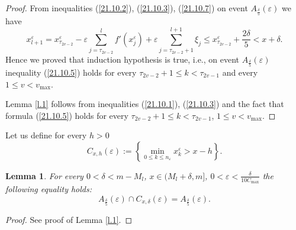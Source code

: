 \documentclass{article}
\theoremstyle{plain}
\newtheorem{lemma}[theorem]{Lemma}
\theoremstyle{definition}
\theoremstyle{remark}
\begin{document}
\begin{proof}
From inequalities (\ref{21.10.2}), (\ref{21.10.3}), (\ref{21.10.7}) on event $A_{\frac{\delta}{5}}\left(\varepsilon\right)$ we have
$$
x_{l+1}^{\varepsilon}=x_{\tau_{2v-2}}^{\varepsilon}-\varepsilon \sum\limits_{j=\tau_{2v-2}}^{l}f'(x_j^{\varepsilon})
+\varepsilon\sum\limits_{j=\tau_{2v-2}+1}^{l+1}\xi_j
\leqslant x_{\tau_{2v-2}}^{\varepsilon}+\frac{2\delta}{5}<x+\delta.
$$
Hence we proved that induction hypothesis is true, i.e., on event $A_{\frac{\delta}{5}}\left(\varepsilon\right)$ inequality (\ref{21.10.5})
holds for every $\tau_{2v-2}+1\leqslant k< \tau_{2v-1}$ and every $1\leqslant v < v_{\max}$.

Lemma \ref{l.1} follows from inequalities (\ref{21.10.1}), (\ref{21.10.3})
and the fact that formula (\ref{21.10.5})
holds for every $\tau_{2v-2}+1\leqslant k< \tau_{2v-1}$, $1\leqslant v < v_{\max}$.
\end{proof}

Let us define for every $h>0$
$$
C_{x,h}\left(\varepsilon\right):=\left\{\min\limits_{0\leqslant k \leqslant n_\varepsilon}x_k^{\varepsilon}>x-h\right\}.
$$

\begin{lemma} \label{l.2}
For every $0<\delta<m-M_{l}$, $x\in(M_{l}+\delta, m]$,
$0<\varepsilon<\frac{\delta}{10 C_{\max}}$ the following equality holds:
$$
A_{\frac{\delta}{5}}\left(\varepsilon\right)\cap C_{x,\delta}\left(\varepsilon\right)=A_{\frac{\delta}{5}}\left(\varepsilon\right).
$$
\end{lemma}
\begin{proof}
See proof of Lemma \ref{l.1}.
\end{proof}
\end{document}
